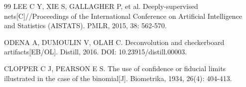 \documentclass[conference]{IEEEtran}
\begin{document}
\begin{thebibliography}{99}
LEE C Y, XIE S, GALLAGHER P, et al. Deeply-supervised nets[C]//Proceedings of the International Conference on Artificial Intelligence and Statistics (AISTATS). PMLR, 2015, 38: 562-570.

ODENA A, DUMOULIN V, OLAH C. Deconvolution and checkerboard artifacts[EB/OL]. Distill, 2016. DOI: 10.23915/distill.00003.

CLOPPER C J, PEARSON E S. The use of confidence or fiducial limits illustrated in the case of the binomial[J]. Biometrika, 1934, 26(4): 404-413.

\end{thebibliography}
\end{document}
